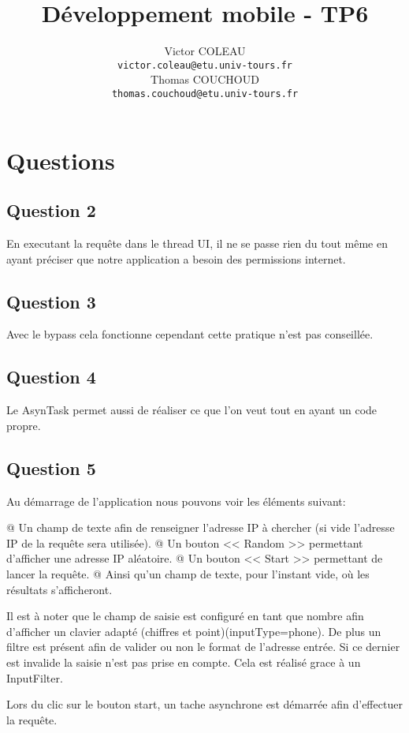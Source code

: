 \documentclass{report}
\title{Développement mobile - TP6}
\author{Victor COLEAU\\\texttt{victor.coleau@etu.univ-tours.fr}\\Thomas COUCHOUD\\\texttt{thomas.couchoud@etu.univ-tours.fr}}
\begin{document}
	\mccTitle
	\tableofcontents
	\chapter{Questions}
		\section{Question 2}
			En executant la requête dans le thread UI, il ne se passe rien du tout même en ayant préciser que notre application a besoin des permissions internet.
			
		\section{Question 3}
			Avec le bypass cela fonctionne cependant cette pratique n'est pas conseillée.
			
		\section{Question 4}
			Le AsynTask permet aussi de réaliser ce que l'on veut tout en ayant un code propre.
			
		\section{Question 5}
			
			Au démarrage de l'application nous pouvons voir les éléments suivant:
			\begin{easylist}[itemize]
				@ Un champ de texte afin de renseigner l'adresse IP à chercher (si vide l'adresse IP de la requête sera utilisée).
				@ Un bouton << Random >> permettant d'afficher une adresse IP aléatoire.
				@ Un bouton << Start >> permettant de lancer la requête.
				@ Ainsi qu'un champ de texte, pour l'instant vide, où les résultats s'afficheront.	
			\end{easylist}

			Il est à noter que le champ de saisie est configuré en tant que nombre afin d'afficher un clavier adapté (chiffres et point)(inputType=phone).
			De plus un filtre est présent afin de valider ou non le format de l'adresse entrée.
			Si ce dernier est invalide la saisie n'est pas prise en compte.
			Cela est réalisé grace à un InputFilter.
			
			Lors du clic sur le bouton start, un tache asynchrone est démarrée afin d'effectuer la requête.
			
			\begin{figure}[H]
				\begin{minipage}{0.45\textwidth}
				\end{minipage}
				\begin{minipage}{0.45\textwidth}
				\end{minipage}
			\end{figure}
			
\end{document}
